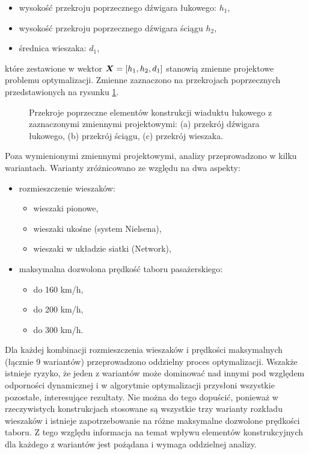 \begin{itemize}
	\item wysokość przekroju poprzecznego dźwigara łukowego: $h_1$,
	\item wysokość przekroju poprzecznego dźwigara ściągu $h_2$,
	\item średnica wieszaka: $d_1$,
\end{itemize}
które zestawione w wektor $\bm{X}=[h_1,h_2,d_1]$ stanowią zmienne projektowe problemu optymalizacji. Zmienne zaznaczono na przekrojach poprzecznych przedstawionych na rysunku \ref{fig:wk2_opti_cs_elements}.
\begin{figure}[hbt!]
	\centering
	 \quad
	 \quad
	\captionsetup{justification=centering}
	\caption{Przekroje poprzeczne elementów konstrukcji wiaduktu łukowego z zaznaczonymi zmiennymi projektowymi: (a) przekrój dźwigara łukowego, (b) przekrój ściągu, (c) przekrój wieszaka.}
	\label{fig:wk2_opti_cs_elements}
\end{figure}

Poza wymienionymi zmiennymi projektowymi, analizy przeprowadzono w kilku wariantach. Warianty zróżnicowano ze względu na dwa aspekty:
\begin{itemize}
	\item rozmieszczenie wieszaków: 
	\begin{itemize}
		\item wieszaki pionowe,
		\item wieszaki ukośne (system Nielsena), 
		\item wieszaki w układzie siatki (Network),
	\end{itemize}
\end{itemize}

\pagebreak[4]
\begin{itemize}
	\item maksymalna dozwolona prędkość taboru pasażerskiego:
	\begin{itemize}
		\item do 160 km/h, 
		\item do 200 km/h,
		\item do 300 km/h.
	\end{itemize} 
\end{itemize}

Dla każdej kombinacji rozmieszczenia wieszaków i prędkości maksymalnych (łącznie 9 wariantów) przeprowadzono oddzielny proces optymalizacji. Wszakże istnieje ryzyko, że jeden z wariantów może dominować nad innymi pod względem odporności dynamicznej i w algorytmie optymalizacji przysłoni wszystkie pozostałe, interesujące rezultaty. Nie można do tego dopuścić, ponieważ w rzeczywistych konstrukcjach stosowane są wszystkie trzy warianty rozkładu wieszaków i istnieje zapotrzebowanie na różne maksymalne dozwolone prędkości taboru. Z tego względu informacja na temat wpływu elementów konstrukcyjnych dla każdego z wariantów jest pożądana i wymaga oddzielnej analizy.

